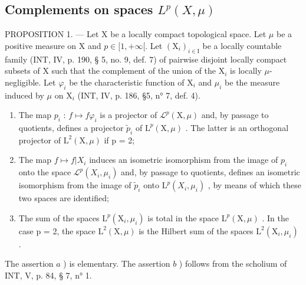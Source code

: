 \subsection{\texorpdfstring{Complements on spaces \(L^{p}(X,\mu)\)}{Further results on L spaces\^{}\{p\}(X,\textbackslash mu)}}

PROPOSITION 1. --- Let X be a locally compact topological space. Let \(\mu\) be a positive measure on X and \(p \in [1, +\infty[\). Let \((\mathrm{X}_i)_{i \in \mathrm{I}}\) be a locally countable family (INT, IV, p. 190, § 5, no. 9, def. 7) of pairwise disjoint locally compact subsets of X such that the complement of the union of the \(\mathrm{X}_i\) is locally \(\mu\)-negligible. Let \(\varphi_i\) be the characteristic function of \(\mathrm{X}_i\) and \(\mu_i\) be the measure induced by \(\mu\) on \(\mathrm{X}_i\) (INT, IV, p. 186, §5, n° 7, def. 4).

\begin{enumerate}
\def\labelenumi{\alph{enumi})}
\item
  The map \(p_{i}\) : \(f \mapsto f\varphi_{i}\) is a projector of \(\mathcal{L}^{p}(\mathrm{X}, \mu)\) and, by passage to quotients, defines a projector \(\widetilde{p}_{i}\) of \(\mathrm{L}^{p}(\mathrm{X}, \mu)\) . The latter is an orthogonal projector of \(\mathrm{L}^{2}(\mathrm{X}, \mu)\) if p = 2;
\item
  The map \(f \mapsto f|X_i\) induces an isometric isomorphism from the image of \(p_i\) onto the space \(\mathcal{L}^p(X_i, \mu_i)\) and, by passage to quotients, defines an isometric isomorphism from the image of \(\widetilde{p}_i\) onto \(\mathrm{L}^p(X_i, \mu_i)\) , by means of which these two spaces are identified;
\item
  The sum of the spaces \(\mathrm{L}^{p}(\mathrm{X}_{i},\mu_{i})\) is total in the space \(\mathrm{L}^{p}(\mathrm{X},\mu)\) . In the case p = 2, the space \(\mathrm{L}^{2}(\mathrm{X},\mu)\) is the Hilbert sum of the spaces \(\mathrm{L}^{2}(\mathrm{X}_{i},\mu_{i})\) .
\end{enumerate}

The assertion \(a\) ) is elementary. The assertion \(b\) ) follows from the scholium of INT, V, p. 84, § 7, n° 1.

